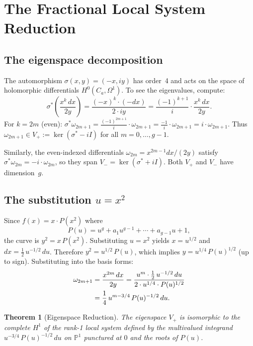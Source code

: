\documentclass[11pt]{article}
\theoremstyle{plain}
\newtheorem{theorem}{Theorem}[section]
\theoremstyle{definition}
\theoremstyle{remark}
\newcommand{\PP}{\mathbb{P}}
\begin{document}
\section{The Fractional Local System Reduction}\label{sec:fls}

\subsection{The eigenspace decomposition}

The automorphism $\sigma(x,y) = (-x, iy)$ has order~4 and acts on the
space of holomorphic differentials $H^0(C_a, \Omega^1)$.  To see the
eigenvalues, compute:
\[
  \sigma^*\!\left(\frac{x^k\,dx}{2y}\right)
  = \frac{(-x)^k \cdot (-dx)}{2 \cdot iy}
  = \frac{(-1)^{k+1}}{i} \cdot \frac{x^k\,dx}{2y}.
\]
For $k = 2m$ (even): $\sigma^*\omega_{2m+1} = \frac{(-1)^{2m+1}}{i} \cdot \omega_{2m+1}
= \frac{-1}{i} \cdot \omega_{2m+1} = i \cdot \omega_{2m+1}$.
Thus $\omega_{2m+1} \in V_+ := \ker(\sigma^* - iI)$ for all $m = 0, \ldots, g-1$.

Similarly, the even-indexed differentials $\omega_{2m} = x^{2m-1}dx/(2y)$
satisfy $\sigma^*\omega_{2m} = -i \cdot \omega_{2m}$, so they span
$V_- = \ker(\sigma^* + iI)$.  Both $V_+$ and $V_-$ have dimension~$g$.

\subsection{The substitution $u = x^2$}

Since $f(x) = x \cdot P(x^2)$ where
\begin{equation}\label{eq:P}
  P(u) = u^g + a_1 u^{g-1} + \cdots + a_{g-1} u + 1,
\end{equation}
the curve is $y^2 = x\, P(x^2)$.
Substituting $u = x^2$ yields $x = u^{1/2}$ and
$dx = \tfrac{1}{2}\,u^{-1/2}\,du$.
Therefore $y^2 = u^{1/2}\, P(u)$, which implies
$y = u^{1/4}\, P(u)^{1/2}$ (up to sign).
Substituting into the basis forms:
\begin{align}
  \omega_{2m+1}
  &= \frac{x^{2m}\,dx}{2y}
  = \frac{u^m \cdot \tfrac{1}{2}\, u^{-1/2}\,du}
         {2 \cdot u^{1/4} \cdot P(u)^{1/2}} \notag \\
  &= \frac{1}{4}\, u^{m - 3/4}\, P(u)^{-1/2}\,du. \label{eq:basis-transform}
\end{align}

\begin{theorem}[Eigenspace Reduction]\label{thm:reduction}
  The eigenspace $V_+$ is isomorphic to the complete $H^1$ of the rank-1
  local system defined by the multivalued integrand
  $u^{-3/4}\, P(u)^{-1/2}\,du$ on $\PP^1$ punctured at $0$ and the roots
  of $P(u)$.
\end{theorem}
\end{document}
